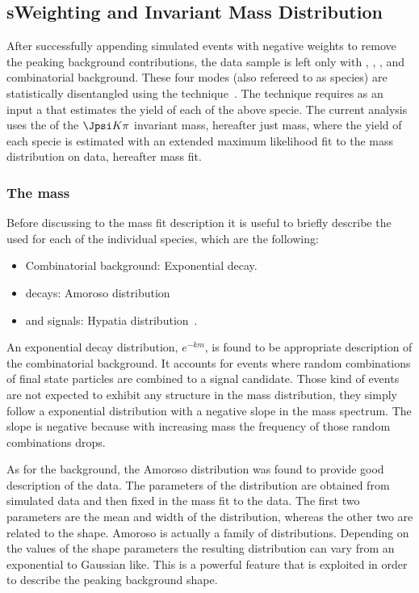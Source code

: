 \subsection{sWeighting and Invariant Mass Distribution}
\label{sWeighting_and_mass}

After successfully appending simulated events with negative weights to remove the peaking background contributions, the data sample is left only with
\BdJpsiKpi, \BsJpsiKpi, \LbJpsippi, and combinatorial background. These four modes (also refereed to as species) are statistically
disentangled using the \sPlot technique~\cite{splot}. The technique requires as an input a \pdf that estimates the yield of each
of the above specie. The current analysis uses the \pdf of the $\Jpsi K\pi$ invariant mass, hereafter just mass, where the yield of each specie
is estimated with an extended maximum likelihood fit to the mass distribution on data, hereafter mass fit.

\subsubsection{The mass \pdf}
Before discussing to the mass fit description it is useful to briefly describe the \pdfs used for each of the individual species, which are the following:

\begin{itemize}
\item Combinatorial background: Exponential decay.
\item \LbJpsippi decays: Amoroso distribution~\cite{Amoroso}
\item \Bd and \Bs signals: Hypatia distribution~\cite{Santos:2013gra}.
\end{itemize}

\noindent An exponential decay distribution, $e^{-km}$, is found to be appropriate description of the combinatorial background. It  accounts
for events where random combinations of final state particles are combined to a signal candidate. Those kind of events are not expected to
exhibit any structure in the mass distribution, they simply follow a exponential distribution with a negative slope in the mass spectrum. The slope is
negative because with increasing mass the frequency of those random combinations drops.

As for the \LbJpsippi background, the Amoroso distribution was found to provide good description of the data.
The parameters of the distribution are obtained from simulated data and then fixed in the mass fit to the data. The first two parameters
are the mean and width of the distribution, whereas the other two are related to the shape. Amoroso is actually a family of distributions.
Depending on the values of the shape parameters the resulting distribution can vary from an exponential to Gaussian like. This is a powerful
feature that is exploited in order to describe the \LbJpsippi peaking background shape.

